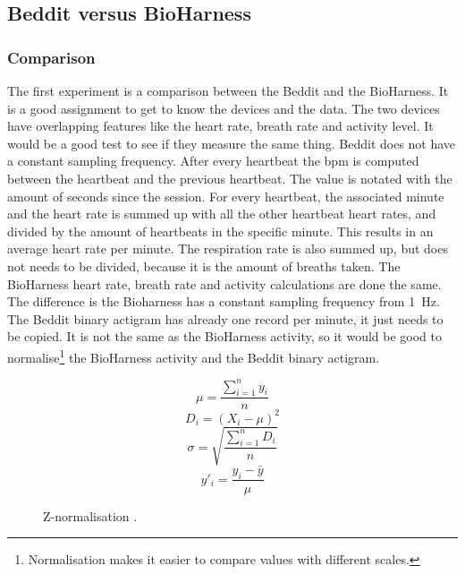 			

	\subsection{Beddit versus BioHarness}
		\label{sec:bvsb}
		\subsubsection{Comparison}
			The first experiment is a comparison between the Beddit and the BioHarness. It is a good assignment to get to know the devices and the data. The two devices have overlapping features like the heart rate, breath rate and activity level. It would be a good test to see if they measure the same thing. 
			Beddit does not have a constant sampling frequency. After every heartbeat the bpm is computed between the heartbeat and the previous heartbeat. The value is notated with the amount of seconds since the session. For every heartbeat, the associated minute and the heart rate is summed up with all the other heartbeat heart rates, and divided by the amount of heartbeats in the specific minute. This results in an average heart rate per minute. The respiration rate is also summed up, but does not needs to be divided, because it is the amount of breaths taken.
			The BioHarness heart rate, breath rate and activity calculations are done the same. The difference is the Bioharness has a constant sampling frequency from \SI{1}{\hertz}. 
			The Beddit binary actigram has already one record per minute, it just needs to be copied. It is not the same as the BioHarness activity, so it would be good to normalise\footnote{Normalisation makes it easier to compare values with different scales.} the BioHarness activity and the Beddit binary actigram.
			\begin{figure}[h]
				\begin{equation*}
					\label{eq:normalisation}
					\mu = \frac{ \sum\limits_{i=1}^n y_i } { n }
				\end{equation*}
				\begin{equation*}
					D_i = (X_i - \mu)^2
				\end{equation*}
				\begin{equation*}
					\sigma = \sqrt{ \frac{ \sum\limits_{i=1}^n D_i } { n } }
				\end{equation*}
				\begin{equation*}
					y'_i = \frac{ y_i - \bar{y} } { \mu }
				\end{equation*}
				\caption{Z-normalisation \cite{statistics}.}
			\end{figure}

